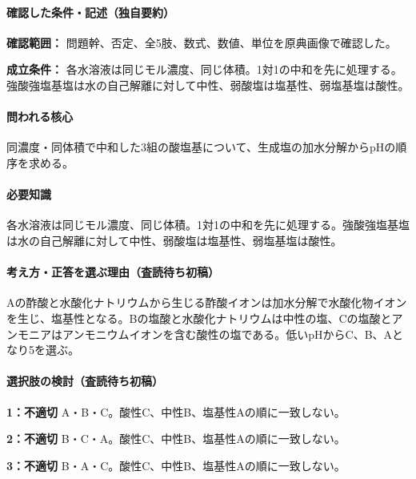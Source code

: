 \paragraph{確認した条件・記述（独自要約）}\mbox{}\par

\noindent\textbf{確認範囲：} 問題幹、否定、全5肢、数式、数値、単位を原典画像で確認した。\par

\noindent\textbf{成立条件：} 各水溶液は同じモル濃度、同じ体積。1対1の中和を先に処理する。強酸強塩基塩は水の自己解離に対して中性、弱酸塩は塩基性、弱塩基塩は酸性。\par

\paragraph{問われる核心} 同濃度・同体積で中和した3組の酸塩基について、生成塩の加水分解からpHの順序を求める。

\paragraph{必要知識} 各水溶液は同じモル濃度、同じ体積。1対1の中和を先に処理する。強酸強塩基塩は水の自己解離に対して中性、弱酸塩は塩基性、弱塩基塩は酸性。

\paragraph{考え方・正答を選ぶ理由（査読待ち初稿）} Aの酢酸と水酸化ナトリウムから生じる酢酸イオンは加水分解で水酸化物イオンを生じ、塩基性となる。Bの塩酸と水酸化ナトリウムは中性の塩、Cの塩酸とアンモニアはアンモニウムイオンを含む酸性の塩である。低いpHからC、B、Aとなり5を選ぶ。

\paragraph{選択肢の検討（査読待ち初稿）}\mbox{}\par

\noindent\textbf{1：不適切} A・B・C。酸性C、中性B、塩基性Aの順に一致しない。\par

\noindent\textbf{2：不適切} B・C・A。酸性C、中性B、塩基性Aの順に一致しない。\par

\noindent\textbf{3：不適切} B・A・C。酸性C、中性B、塩基性Aの順に一致しない。\par

